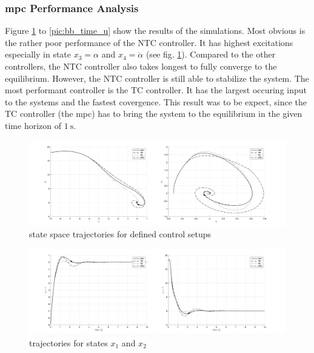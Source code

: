 \documentclass[10pt,a4paper,titlepage]{article}
\begin{document}
\subsubsection*{\gls{mpc} Performance Analysis}
Figure \ref{pic:bb_state_space} to \ref{pic:bb_time_u} show the results of the simulations. Most obvious is the rather poor performance of the NTC controller.
It has highest excitations especially in state $x_3 = \alpha$ and $x_4 = \dot{\alpha}$ (see fig. \ref{pic:bb_state_space}). Compared to the other controllers,
the NTC controller also takes longest to fully converge to the equilibrium. However, the NTC controller is still able to
stabilize the system. The most performant controller is the TC controller. It has the largest occuring input to the systems  and the fastest covergence.
This result was to be expect, since the TC controller (the \gls{mpc}) has to bring the system to the equilibrium in the given time horizon of $\SI{1}{\second}$. 

\begin{figure}[h]
	\begin{center}
		\includegraphics[width=\textwidth]{img/bb_states.png}
		\caption{state space trajectories for defined control setups}
		\label{pic:bb_state_space}
	\end{center}
\end{figure}

\begin{figure}[h!]
	\begin{center}
		\includegraphics[width=\textwidth]{img/bb_time_x1x2.png}
		\caption{trajectories for states $x_1$ and $x_2$}
		\label{pic:bb_time_x1x2}
	\end{center}
\end{figure}
\end{document}
